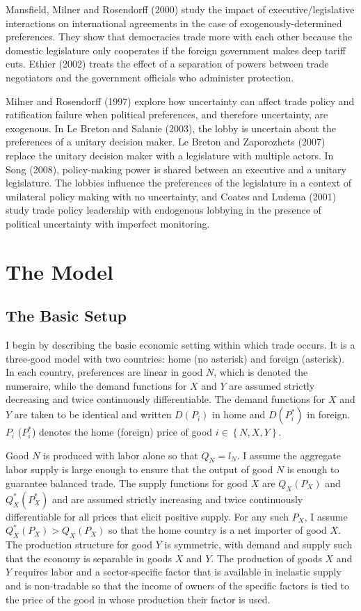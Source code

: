 \documentclass[10pt]{article}
\begin{document}
Mansfield, Milner and Rosendorff (2000) study the impact of executive/legislative interactions on international agreements in the case of exogenously-determined preferences. They show that democracies trade more with each other because the domestic legislature only cooperates if the foreign government makes deep tariff cuts. Ethier (2002) treats the effect of a separation of powers between trade negotiators and the government officials who administer protection.

Milner and Rosendorff (1997) explore how uncertainty can affect trade policy and ratification failure when political preferences, and therefore uncertainty, are exogenous. In Le Breton and Salanie (2003), the lobby is uncertain about the preferences of a unitary decision maker. Le Breton and Zaporozhets (2007) replace the unitary decision maker with a legislature with multiple actors. In Song (2008), policy-making power is shared between an executive and a unitary legislature. The lobbies influence the preferences of the legislature in a context of unilateral policy making with no uncertainty, and Coates and Ludema (2001) study trade policy leadership with endogenous lobbying in the presence of political uncertainty with imperfect monitoring.


\section{The Model}
\label{sec:model}

\subsection{The Basic Setup}
\label{sec:basic}
I begin by describing the basic economic setting within which trade occurs. It is a three-good model with two countries: home (no asterisk) and foreign (asterisk). In each country, preferences are linear in good $N$, which is denoted the numeraire, while the demand functions for $X$ and $Y$ are assumed strictly decreasing and twice continuously differentiable. The demand functions for $X$ and $Y$ are taken to be identical and written $D(P_i)$ in home and $D(P_i^*)$ in foreign. $P_i$ ($P_i^*$) denotes the home (foreign) price of good $i \in \left\{N,X,Y\right\}$.

Good $N$ is produced with labor alone so that $Q_N = l_N$. I assume the aggregate labor supply is large enough to ensure that the output of good $N$ is enough to guarantee balanced trade. The supply functions for good $X$ are $Q_X(P_X)$ and $Q_X^*(P_X^*)$ and are assumed strictly increasing and twice continuously differentiable for all prices that elicit positive supply. For any such $P_X$, I assume $Q_X^*(P_X) > Q_X(P_X)$ so that the home country is a net importer of good $X$. The production structure for good $Y$ is symmetric, with demand and supply such that the economy is separable in goods $X$ and $Y$. The production of goods $X$ and $Y$ requires labor and a sector-specific factor that is available in inelastic supply and is non-tradable so that the income of owners of the specific factors is tied to the price of the good in whose production their factor is used. 
\end{document}
